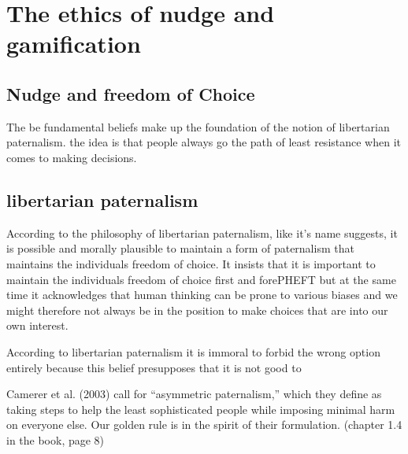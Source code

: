 

\section{The ethics of nudge and gamification}

\subsection{Nudge and freedom of Choice}
The be fundamental beliefs make up the foundation of the notion of libertarian paternalism.
the idea is that people always go the path of least resistance when it comes to making  decisions.

\subsection{libertarian paternalism}
According to the  philosophy of libertarian paternalism, like it's name suggests, it is possible and morally plausible to maintain a form of paternalism that maintains the individuals freedom of choice. It insists that it is important to maintain the individuals freedom of choice first and forePHEFT but at the same time it acknowledges that human thinking can be prone to  various biases and we might therefore not always be in the position to make choices that are into our own interest.


According to libertarian paternalism it is immoral to  forbid the wrong option entirely because this belief presupposes that it is not good to

Camerer et al. (2003) call for “asymmetric paternalism,” which they define as taking steps to help the least sophisticated people while imposing minimal harm on everyone else. Our golden rule is in the spirit of their formulation.
(chapter 1.4 in the book, page 8)
